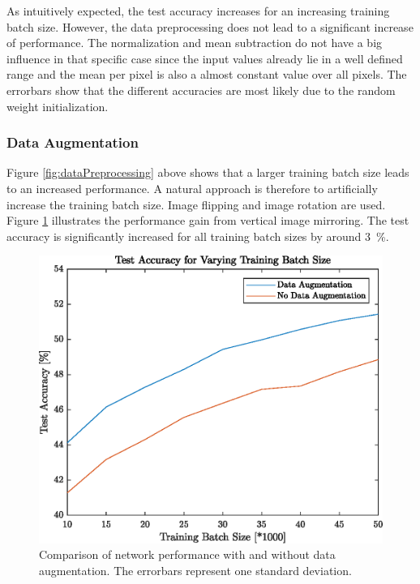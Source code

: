    	As intuitively expected, the test accuracy increases for an increasing training batch size. However, the data preprocessing does not lead to a significant increase of performance. The normalization and mean subtraction do not have a big influence in that specific case since the input values already lie in a well defined range and the mean per pixel is also a almost constant value over all pixels. The errorbars show that the different accuracies are most likely due to the random weight initialization.
   	
\FloatBarrier
\subsubsection{Data Augmentation}
	    	
   	Figure \ref{fig:dataPreprocessing} above shows that a larger training batch size leads to an increased performance. A natural approach is therefore to artificially increase the training batch size. Image flipping and image rotation are used. Figure \ref{fig:dataAugmentation} illustrates the performance gain from vertical image mirroring. The test accuracy is significantly increased for all training batch sizes by around \SI{3}{\percent}.
   	
   	\begin{figure}[h!]
		\centering
   	  	\includegraphics{images/dataAugmentation}
   	  	\caption{Comparison of network performance with and without data augmentation. The errorbars represent one standard deviation.}
   	  	\label{fig:dataAugmentation}
   	\end{figure}
\FloatBarrier

